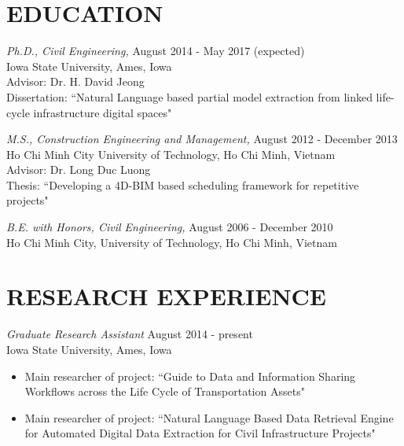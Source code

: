 \documentclass[11pt]{res}
\begin{document}
\begin{resume}


\section{EDUCATION}

{\sl Ph.D., Civil Engineering,}  \hfill August 2014 - May 2017 (expected) \\
Iowa State University, Ames, Iowa\\
Advisor: Dr. H. David Jeong\\
Dissertation: ``Natural Language based partial model extraction from linked life-cycle infrastructure digital spaces"

{\sl M.S., Construction Engineering and Management,}  \hfill August 2012 - December 2013 \\
Ho Chi Minh City University of Technology, Ho Chi Minh, Vietnam\\
Advisor: Dr. Long Duc Luong\\
Thesis: ``Developing a 4D-BIM based scheduling framework for repetitive projects"

{\sl B.E. with Honors, Civil Engineering,}  \hfill August 2006 - December 2010 \\
Ho Chi Minh City, University of Technology, Ho Chi Minh, Vietnam
  
 
\section{RESEARCH EXPERIENCE}

{\sl Graduate Research Assistant} \hfill August 2014 - present \\
Iowa State University, Ames, Iowa
\begin{itemize}
\item Main researcher of project: ``Guide to Data and Information Sharing Workflows across the Life Cycle of Transportation Assets"
\item Main researcher of project: ``Natural Language Based Data Retrieval Engine for Automated Digital Data Extraction for Civil Infrastructure Projects"
\end{itemize} 


\end{resume}
\end{document}
